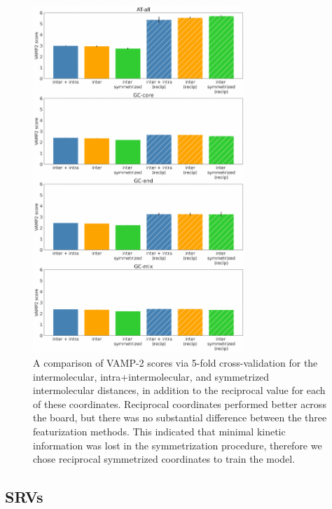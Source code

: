 \documentclass[journal=jpcbfk,manuscript=article]{achemso}
\begin{document}
\begin{figure}[ht!]
	\begin{center}
        \includegraphics[width=80mm,
        scale=0.5]{Fig1.pdf}
        \caption{A comparison of VAMP-2 scores via 5-fold cross-validation for the intermolecular, intra+intermolecular,  and symmetrized intermolecular distances, in addition to the reciprocal value for each of these coordinates. Reciprocal coordinates performed better across the board, but there was no substantial difference between the three featurization methods. This indicated that minimal kinetic information was lost in the symmetrization procedure, therefore we chose reciprocal symmetrized coordinates to train the model.}
        \label{fig:allseq_features_vamp2}
	\end{center}
\end{figure}


\subsection{\label{sec:methods}SRVs}
 
\end{document}
